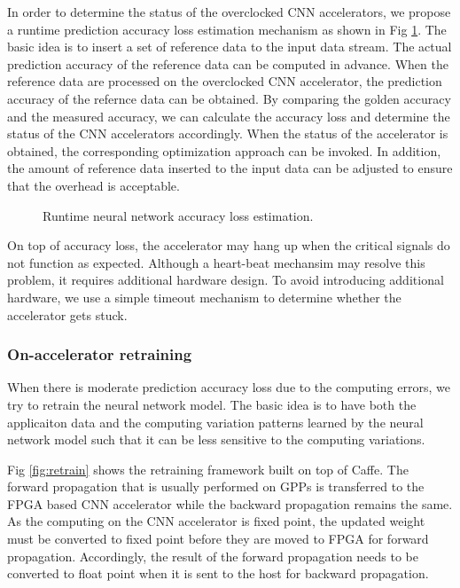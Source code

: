 In order to determine the status of the overclocked CNN accelerators, 
we propose a runtime prediction accuracy loss estimation mechanism 
as shown in Fig \ref{fig:loss-estimation}. The basic idea is to insert a set 
of reference data to the input data stream. The actual prediction 
accuracy of the reference data can be computed in advance. When the 
reference data are processed on the overclocked CNN accelerator, the 
prediction accuracy of the refernce data can be obtained. By comparing the 
golden accuracy and the measured accuracy, we can calculate the accuracy loss and 
determine the status of the CNN accelerators accordingly. When the status of 
the accelerator is obtained, the corresponding optimization approach 
can be invoked. In addition, the amount of reference data inserted to 
the input data can be adjusted to ensure that the overhead is acceptable.

\begin{figure}
    \caption{Runtime neural network accuracy loss estimation.}
\label{fig:loss-estimation}
\vspace{-1em}
\end{figure}

On top of accuracy loss, the accelerator may hang up when the critical signals 
do not function as expected. Although a heart-beat mechansim may resolve this problem, 
it requires additional hardware design. To avoid introducing additional hardware, 
we use a simple timeout mechanism to determine whether the accelerator gets stuck. 

\subsubsection{On-accelerator retraining}
When there is moderate prediction accuracy loss due to the computing errors, 
we try to retrain the neural network model. The basic idea is to have both the 
applicaiton data and the computing variation patterns learned by the neural 
network model such that it can be less sensitive to the computing variations. 

Fig \ref{fig:retrain} shows the retraining framework built on top of Caffe.
The forward propagation that is usually performed on GPPs is transferred to 
the FPGA based CNN accelerator while the backward propagation remains the 
same. As the computing on the CNN accelerator is fixed point, the updated 
weight must be converted to fixed point before they are moved to FPGA 
for forward propagation. Accordingly, the result of the forward propagation 
needs to be converted to float point when it is sent to the host for backward 
propagation.

